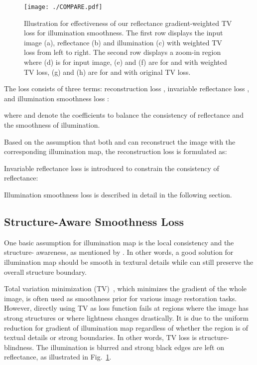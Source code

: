\documentclass{bmvc2k}
\begin{document}
\begin{figure}
	\begin{minipage}[t]{\linewidth}
		\centering
		\texttt{[image: ./COMPARE.pdf]}
        \vspace{-0.6cm}
	    \caption{Illustration for effectiveness of our reflectance gradient-weighted TV loss for illumination smoothness. The first row displays the input image (a), reflectance (b) and illumination (c) with weighted TV loss from left to right. The second row displays a zoom-in region where (d) is for input image, (e) and (f) are for  and  with weighted TV loss, (g) and (h) are for  and  with original TV loss.}
	    \label{fig:smoothness_loss}
    \end{minipage}
\end{figure}

The loss  consists of three terms: reconstruction loss , invariable reflectance loss , and illumination smoothness loss :

where  and  denote the coefficients to balance the consistency of reflectance and the smoothness of illumination.

Based on the assumption that both  and  can reconstruct the image with the corresponding illumination map, the reconstruction loss  is formulated as:

Invariable reflectance loss  is introduced to constrain the consistency of reflectance:

Illumination smoothness loss  is described in detail in the following section.

\subsection{Structure-Aware Smoothness Loss}
 One basic assumption for illumination map is the local consistency and the structure- awareness, as mentioned by \cite{Guo2017LIME}. In other words, a good solution for illumination map should be smooth in textural details while can still preserve the overall structure boundary.

 Total variation minimization (TV)~\cite{Chan2011An}, which minimizes the gradient of the whole image, is often used as smoothness prior for various image restoration tasks. However, directly using TV as loss function fails at regions where the image has strong structures or where lightness changes drastically. It is due to the uniform reduction for gradient of illumination map regardless of whether the region is of textual details or strong boundaries. In other words, TV loss is structure-blindness. The illumination is blurred and strong black edges are left on reflectance, as illustrated in Fig.~\ref{fig:smoothness_loss}.
\end{document}
